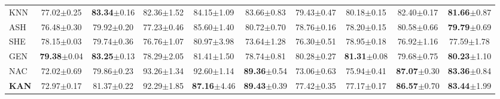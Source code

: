 \begin{table}[ht]
\begin{center}
{\begin{tabular}{lccccccccc}
KNN & 77.02\scriptsize{$\pm$0.25} & \textbf{83.34}\scriptsize{$\pm$0.16} & 82.36\scriptsize{$\pm$1.52} & 84.15\scriptsize{$\pm$1.09} & 83.66\scriptsize{$\pm$0.83} & 79.43\scriptsize{$\pm$0.47} & 80.18\scriptsize{$\pm$0.15} & 82.40\scriptsize{$\pm$0.17} & \textbf{81.66}\scriptsize{$\pm$0.87}\\
ASH & 76.48\scriptsize{$\pm$0.30} & 79.92\scriptsize{$\pm$0.20} & 77.23\scriptsize{$\pm$0.46} & 85.60\scriptsize{$\pm$1.40} & 80.72\scriptsize{$\pm$0.70} & 78.76\scriptsize{$\pm$0.16} & 78.20\scriptsize{$\pm$0.15} & 80.58\scriptsize{$\pm$0.66} & \textbf{79.79}\scriptsize{$\pm$0.69}\\
SHE & 78.15\scriptsize{$\pm$0.03} & 79.74\scriptsize{$\pm$0.36} & 76.76\scriptsize{$\pm$1.07} & 80.97\scriptsize{$\pm$3.98} & 73.64\scriptsize{$\pm$1.28} & 76.30\scriptsize{$\pm$0.51} & 78.95\scriptsize{$\pm$0.18} & 76.92\scriptsize{$\pm$1.16} & 77.59\scriptsize{$\pm$1.78}\\
GEN & \textbf{79.38}\scriptsize{$\pm$0.04} & \textbf{83.25}\scriptsize{$\pm$0.13} & 78.29\scriptsize{$\pm$2.05} & 81.41\scriptsize{$\pm$1.50} & 78.74\scriptsize{$\pm$0.81} & 80.28\scriptsize{$\pm$0.27} & \textbf{81.31}\scriptsize{$\pm$0.08} & 79.68\scriptsize{$\pm$0.75} & \textbf{80.23}\scriptsize{$\pm$1.10}\\
NAC & 72.02\scriptsize{$\pm$0.69} & 79.86\scriptsize{$\pm$0.23} & 93.26\scriptsize{$\pm$1.34} & 92.60\scriptsize{$\pm$1.14} & \textbf{89.36}\scriptsize{$\pm$0.54} & 73.06\scriptsize{$\pm$0.63} & 75.94\scriptsize{$\pm$0.41} & \textbf{87.07}\scriptsize{$\pm$0.30} & \textbf{83.36}\scriptsize{$\pm$0.84} \\
\rowcolor[HTML]{E7E6E6}
\textbf{KAN} & 72.97\scriptsize{$\pm$0.17} & 81.37\scriptsize{$\pm$0.22} & 92.29\scriptsize{$\pm$1.85} & \textbf{87.16}\scriptsize{$\pm$4.46} & \textbf{89.43}\scriptsize{$\pm$0.39} & 77.42\scriptsize{$\pm$0.35} & 77.17\scriptsize{$\pm$0.17} & \textbf{86.57}\scriptsize{$\pm$0.70} & \textbf{83.44}\scriptsize{$\pm$1.99} \\
\bottomrule
\end{tabular}
}
\end{center}
\end{table}



